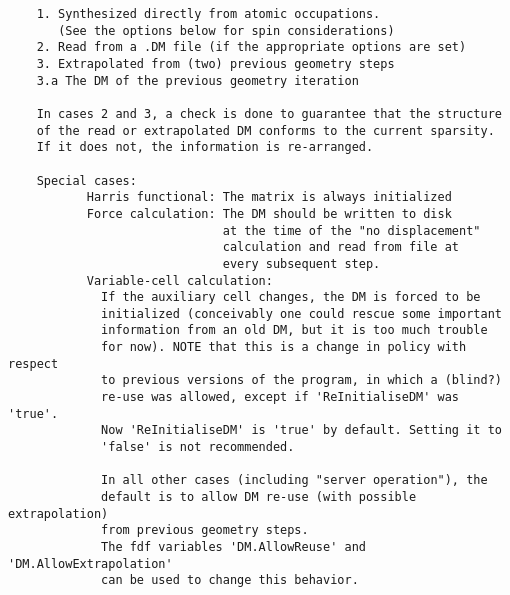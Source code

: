 \documentclass[11pt]{article}
\begin{document}
\begin{verbatim}
    1. Synthesized directly from atomic occupations.
       (See the options below for spin considerations)
    2. Read from a .DM file (if the appropriate options are set)
    3. Extrapolated from (two) previous geometry steps
    3.a The DM of the previous geometry iteration

    In cases 2 and 3, a check is done to guarantee that the structure
    of the read or extrapolated DM conforms to the current sparsity.
    If it does not, the information is re-arranged.

    Special cases:
           Harris functional: The matrix is always initialized
           Force calculation: The DM should be written to disk
                              at the time of the "no displacement"
                              calculation and read from file at
                              every subsequent step.
           Variable-cell calculation:
             If the auxiliary cell changes, the DM is forced to be
             initialized (conceivably one could rescue some important
             information from an old DM, but it is too much trouble 
             for now). NOTE that this is a change in policy with respect
             to previous versions of the program, in which a (blind?)
             re-use was allowed, except if 'ReInitialiseDM' was 'true'.
             Now 'ReInitialiseDM' is 'true' by default. Setting it to
             'false' is not recommended.

             In all other cases (including "server operation"), the 
             default is to allow DM re-use (with possible extrapolation) 
             from previous geometry steps.
             The fdf variables 'DM.AllowReuse' and 'DM.AllowExtrapolation'
             can be used to change this behavior.
             
\end{verbatim}
\end{document}
